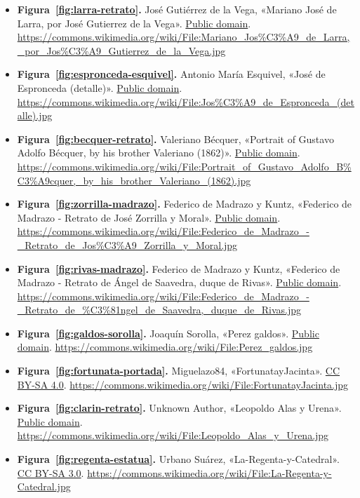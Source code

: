 \documentclass{book}
\begin{document}
\begin{itemize}
\item \textbf{Figura~\ref{fig:larra-retrato}.} José Gutiérrez de la Vega, «Mariano José de Larra, por José Gutierrez de la Vega». \href{https://creativecommons.org/publicdomain/mark/1.0/}{Public domain}. \url{https://commons.wikimedia.org/wiki/File:Mariano_Jos%C3%A9_de_Larra,_por_Jos%C3%A9_Gutierrez_de_la_Vega.jpg}
\item \textbf{Figura~\ref{fig:espronceda-esquivel}.} Antonio María Esquivel, «José de Espronceda (detalle)». \href{https://creativecommons.org/publicdomain/mark/1.0/}{Public domain}. \url{https://commons.wikimedia.org/wiki/File:Jos%C3%A9_de_Espronceda_(detalle).jpg}
\item \textbf{Figura~\ref{fig:becquer-retrato}.} Valeriano Bécquer, «Portrait of Gustavo Adolfo Bécquer, by his brother Valeriano (1862)». \href{https://creativecommons.org/publicdomain/mark/1.0/}{Public domain}. \url{https://commons.wikimedia.org/wiki/File:Portrait_of_Gustavo_Adolfo_B%C3%A9cquer,_by_his_brother_Valeriano_(1862).jpg}
\item \textbf{Figura~\ref{fig:zorrilla-madrazo}.} Federico de Madrazo y Kuntz, «Federico de Madrazo - Retrato de José Zorrilla y Moral». \href{https://creativecommons.org/publicdomain/mark/1.0/}{Public domain}. \url{https://commons.wikimedia.org/wiki/File:Federico_de_Madrazo_-_Retrato_de_Jos%C3%A9_Zorrilla_y_Moral.jpg}
\item \textbf{Figura~\ref{fig:rivas-madrazo}.} Federico de Madrazo y Kuntz, «Federico de Madrazo - Retrato de Ángel de Saavedra, duque de Rivas». \href{https://creativecommons.org/publicdomain/mark/1.0/}{Public domain}. \url{https://commons.wikimedia.org/wiki/File:Federico_de_Madrazo_-_Retrato_de_%C3%81ngel_de_Saavedra,_duque_de_Rivas.jpg}
\item \textbf{Figura~\ref{fig:galdos-sorolla}.} Joaquín Sorolla, «Perez galdos». \href{https://creativecommons.org/publicdomain/mark/1.0/}{Public domain}. \url{https://commons.wikimedia.org/wiki/File:Perez_galdos.jpg}
\item \textbf{Figura~\ref{fig:fortunata-portada}.} Miguelazo84, «FortunatayJacinta». \href{https://creativecommons.org/licenses/by-sa/4.0/}{CC BY-SA 4.0}. \url{https://commons.wikimedia.org/wiki/File:FortunatayJacinta.jpg}
\item \textbf{Figura~\ref{fig:clarin-retrato}.} Unknown Author, «Leopoldo Alas y Urena». \href{https://creativecommons.org/publicdomain/mark/1.0/}{Public domain}. \url{https://commons.wikimedia.org/wiki/File:Leopoldo_Alas_y_Urena.jpg}
\item \textbf{Figura~\ref{fig:regenta-estatua}.} Urbano Suárez, «La-Regenta-y-Catedral». \href{https://creativecommons.org/licenses/by-sa/3.0/}{CC BY-SA 3.0}. \url{https://commons.wikimedia.org/wiki/File:La-Regenta-y-Catedral.jpg}

\end{itemize}
\end{document}
